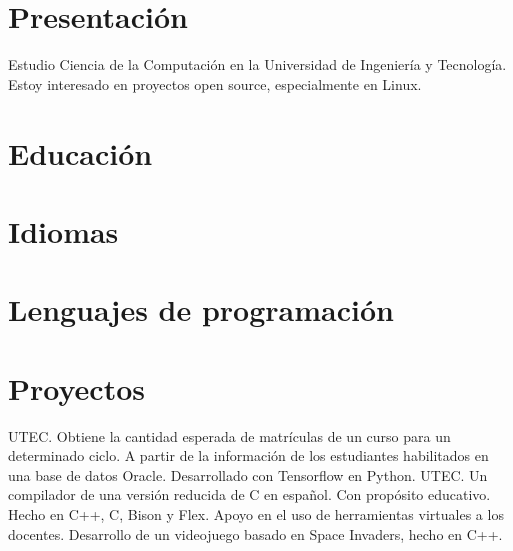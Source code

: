 \documentclass[10pt, a4paper]{moderncv}
\begin{document}
\maketitle
\section{Presentación}
Estudio Ciencia de la Computación en la Universidad de Ingeniería y Tecnología.
Estoy interesado en proyectos open source, especialmente en Linux.

\section{Educación}


\section{Idiomas}


\section{Lenguajes de programación}
\cvlistitem{\LaTeX}

\section{Proyectos}
{
	UTEC.
	Obtiene la cantidad esperada de matrículas de un curso para un
	determinado ciclo.
	A partir de la información de los estudiantes habilitados en
	una base de datos Oracle.
	Desarrollado con Tensorflow en Python.
}
{
	UTEC.
	Un compilador de una versión reducida de C en español.
	Con propósito educativo.
	Hecho en C++, C, Bison y Flex.
}
{
	Apoyo en el uso de herramientas virtuales a los docentes.
}
{
	Desarrollo de un videojuego basado en Space Invaders, hecho en C++.
}
\end{document}
